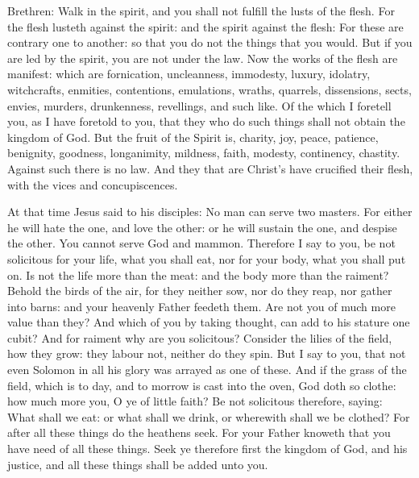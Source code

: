 Brethren: Walk in the spirit, and you shall not fulfill the
lusts of the flesh.
For the flesh lusteth against the spirit: and the spirit against
the flesh: For these are contrary one to another: so that you do not the
things that you would.
But if you are led by the spirit, you are not under the law.
Now the works of the flesh are manifest: which are fornication,
uncleanness, immodesty, luxury,
idolatry, witchcrafts, enmities, contentions, emulations, wraths,
quarrels, dissensions, sects,
envies, murders, drunkenness, revellings, and such like.  Of the
which I foretell you, as I have foretold to you, that they who do such
things shall not obtain the kingdom of God.
But the fruit of the Spirit is, charity, joy, peace, patience,
benignity, goodness, longanimity,
mildness, faith, modesty, continency, chastity. Against such there
is no law.
And they that are Christ's have crucified their flesh, with the
vices and concupiscences.



At that time Jesus said to his disciples:
No man can serve two masters. For either he will hate the one, and
love the other: or he will sustain the one, and despise the other. You
cannot serve God and mammon.
Therefore I say to you, be not solicitous for your life, what you
shall eat, nor for your body, what you shall put on.  Is not the life
more than the meat: and the body more than the raiment?
Behold the birds of the air, for they neither sow, nor do they
reap, nor gather into barns: and your heavenly Father feedeth them. Are
not you of much more value than they?
And which of you by taking thought, can add to his stature one
cubit?
And for raiment why are you solicitous? Consider the lilies of the
field, how they grow: they labour not, neither do they spin.
But I say to you, that not even Solomon in all his glory was
arrayed as one of these.
And if the grass of the field, which is to day, and to morrow is
cast into the oven, God doth so clothe: how much more you, O ye of
little faith?
Be not solicitous therefore, saying: What shall we eat: or what
shall we drink, or wherewith shall we be clothed?
For after all these things do the heathens seek. For your Father
knoweth that you have need of all these things.
Seek ye therefore first the kingdom of God, and his justice, and
all these things shall be added unto you.




